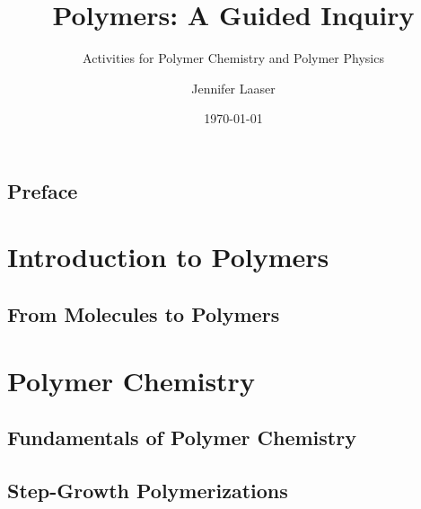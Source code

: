 \documentclass[book]{pogil}
\author{Jennifer Laaser}
\title{Polymers: A Guided Inquiry}
\subtitle{Activities for Polymer Chemistry and Polymer Physics}
\date{\today}
\begin{document}
\frontmatter
\pagestyle{empty}
\titlepage
\clearpage

\copyrightpage
\clearpage

\chapter{Preface}
%
%

\clearpage

\tableofcontents*
\clearpage

\mainmatter
\pagestyle{fancy}

\part{Introduction to Polymers}

	\chapter{From Molecules to Polymers}
		
		
		
		
		

\part{Polymer Chemistry}

	\chapter{Fundamentals of Polymer Chemistry}
		

	\chapter{Step-Growth Polymerizations}
		
		
		
		
		
		
\end{document}
